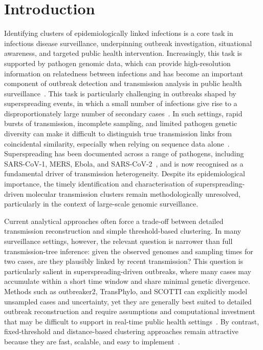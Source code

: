 \documentclass[10pt,letterpaper]{article}
\begin{document}
\linenumbers

\section*{Introduction}

Identifying clusters of epidemiologically linked infections is a core task in infectious disease surveillance, underpinning outbreak investigation, situational awareness, and targeted public health intervention. Increasingly, this task is supported by pathogen genomic data, which can provide high-resolution information on relatedness between infections and has become an important component of outbreak detection and transmission analysis in public health surveillance~\cite{Armstrong2019, Struelens2024}. This task is particularly challenging in outbreaks shaped by superspreading events, in which a small number of infections give rise to a disproportionately large number of secondary cases~\cite{LloydSmith2005}. In such settings, rapid bursts of transmission, incomplete sampling, and limited pathogen genetic diversity can make it difficult to distinguish true transmission links from coincidental similarity, especially when relying on sequence data alone~\cite{Valesano2021, Bendall2022}. Superspreading has been documented across a range of pathogens, including SARS-CoV-1, MERS, Ebola, and SARS-CoV-2~\cite{Shen2004, Lau2017, Cho2016, Lee2020, McKee2024}, and is now recognised as a fundamental driver of transmission heterogeneity. Despite its epidemiological importance, the timely identification and characterisation of superspreading-driven molecular transmission clusters remain methodologically unresolved, particularly in the context of large-scale genomic surveillance.

Current analytical approaches often force a trade-off between detailed transmission reconstruction and simple threshold-based clustering. In many surveillance settings, however, the relevant question is narrower than full transmission-tree inference: given the observed genomes and sampling times for two cases, are they plausibly linked by recent transmission? This question is particularly salient in superspreading-driven outbreaks, where many cases may accumulate within a short time window and share minimal genetic divergence. Methods such as outbreaker2, TransPhylo, and SCOTTI can explicitly model unsampled cases and uncertainty, yet they are generally best suited to detailed outbreak reconstruction and require assumptions and computational investment that may be difficult to support in real-time public health settings~\cite{Jombart2010, Jombart2014, Didelot2017, DeMaio2016, Campbell2018b}. By contrast, fixed-threshold and distance-based clustering approaches remain attractive because they are fast, scalable, and easy to implement~\cite{Stimson2019, Poon2016, Campbell2018a, Illingworth2022, Sobkowiak2022, Sobkowiak2023}.
\end{document}
